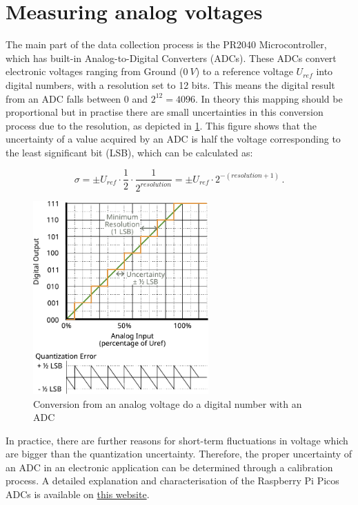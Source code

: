 \section{Measuring analog voltages}

The main part of the data collection process is the PR2040 Microcontroller, which has built-in Analog-to-Digital Converters (ADCs). These ADCs convert electronic voltages ranging from Ground ($\SI{0}{V}$) to a reference voltage $U_{ref}$ into digital numbers, with a resolution set to 12 bits. This means the digital result from an ADC falls between $0$ and $2^{12} = 4096$. In theory this mapping should be proportional but in practise there are small uncertainties in this conversion process due to the resolution, as depicted in \cref{fig:ADC-Curve}. This figure shows that the uncertainty of a value acquired by an ADC is half the voltage corresponding to the least significant bit (LSB), which can be calculated as:

\begin{equation*}
	\sigma = \pm{} U_{ref} \cdot \frac{1}{2} \cdot \frac{1}{2^{resolution}} = \pm{} U_{ref} \cdot 2^{-(resolution + 1)}\,.
\end{equation*}

\begin{figure}[htb]
		\centering
		\includegraphics[width=0.6\textwidth]{./fig/ADC-conversion-curve-export.pdf}
		\caption{Conversion from an analog voltage do a digital number with an ADC}
		\label{fig:ADC-Curve}
\end{figure}

In practice, there are further reasons for short-term fluctuations in voltage which are bigger than the quantization uncertainty. Therefore, the proper uncertainty of an ADC in an electronic application can be determined through a  calibration process. A detailed explanation and characterisation of the Raspberry Pi Picos ADCs is available on \href{http://pico-adc.markomo.me/}{this website}.

